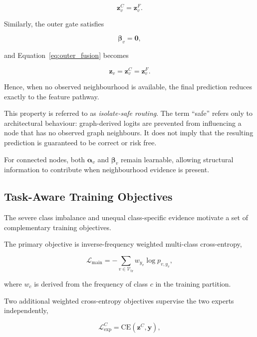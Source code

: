 \documentclass{ieeeaccess}
\begin{document}
\begin{equation}
\mathbf{z}^{C}_v
=
\mathbf{z}^{F}_v.
\end{equation}

Similarly, the outer gate satisfies

\begin{equation}
\boldsymbol{\beta}_v=\mathbf{0},
\end{equation}

and Equation~\ref{eq:outer_fusion} becomes

\begin{equation}
\mathbf{z}_v
=
\mathbf{z}^{C}_v
=
\mathbf{z}^{F}_v.
\label{eq:isolate_fallback}
\end{equation}

Hence, when no observed neighbourhood is available, the final prediction reduces exactly to the feature pathway.

This property is referred to as \textit{isolate-safe routing}. The term ``safe'' refers only to architectural behaviour: graph-derived logits are prevented from influencing a node that has no observed graph neighbours. It does not imply that the resulting prediction is guaranteed to be correct or risk free.

For connected nodes, both \(\boldsymbol{\alpha}_v\) and \(\boldsymbol{\beta}_v\) remain learnable, allowing structural information to contribute when neighbourhood evidence is present.


\subsection{Task-Aware Training Objectives}

The severe class imbalance and unequal class-specific evidence motivate a set of complementary training objectives.

The primary objective is inverse-frequency weighted multi-class cross-entropy,

\begin{equation}
\mathcal{L}_{\mathrm{main}}
=
-
\sum_{v\in\mathcal{V}_{\mathrm{tr}}}
w_{y_v}
\log p_{v,y_v},
\label{eq:main_loss}
\end{equation}

where \(w_c\) is derived from the frequency of class \(c\) in the training partition.

Two additional weighted cross-entropy objectives supervise the two experts independently,

\begin{equation}
\mathcal{L}^{C}_{\mathrm{exp}}
=
\mathrm{CE}
\left(
\mathbf{z}^{C},
\mathbf{y}
\right),
\end{equation}
\end{document}
